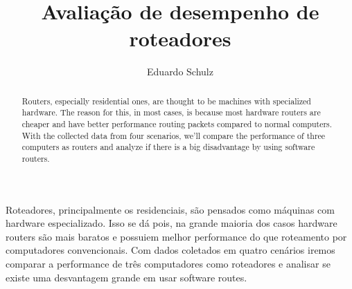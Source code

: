 \documentclass[12pt]{article}
\title{Avaliação de desempenho de roteadores}
\author{Eduardo Schulz\inst{1}}
\begin{document}
 

\maketitle

\begin{abstract}
Routers, especially residential ones, are thought to be machines with specialized hardware. The reason for this, in most cases, is because most hardware routers are cheaper and have better performance routing packets compared to normal computers. With the collected data from four scenarios, we'll compare the performance of three computers as routers and analyze if there is a big disadvantage by using software routers.
\end{abstract}
     
\begin{resumo} 
	Roteadores, principalmente os residenciais, são pensados como máquinas com hardware especializado. Isso se dá pois, na grande maioria dos casos hardware routers são mais baratos e possuiem melhor performance do que roteamento por computadores convencionais. Com dados coletados em quatro cenários iremos comparar a performance de três computadores como roteadores e analisar se existe uma desvantagem grande em usar software routes.
\end{resumo}










\end{document}
